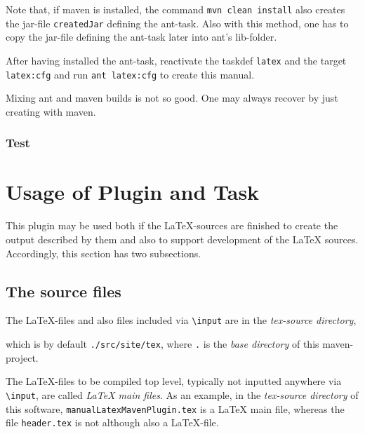 \documentclass[12pt]{book}
\renewcommand{\index}[1]{ }
\begin{document}
Note that, if maven is installed, the command \texttt{mvn clean install} 
also creates the jar-file \texttt{createdJar} defining the ant-task. 
Also with this method, one has to copy the jar-file defining the ant-task 
later into ant's lib-folder. 

After having installed the ant-task, 
reactivate the taskdef \texttt{latex} and the target \texttt{latex:cfg} 
and run \texttt{ant latex:cfg} to create this manual. 

Mixing ant and maven builds is not so good. 
One may always recover by just creating with maven. 

\subsection{Test}

\chapter{Usage of Plugin and Task}\label{chap:usage}

This plugin may be used both if the \LaTeX-sources are finished 
to create the output described by them 
and also to support development of the \LaTeX{} sources. 
Accordingly, this section has two subsections. 

\section{The source files}\label{sec:sources}

The \LaTeX-files and also files included via {\tt\textbackslash input} 
are in the {\em tex-source directory}, 
\index{tex-source directory}
which is by default {\tt./src/site/tex}, 
where {\tt.} is the {\em base directory\/} of this maven-project. 
\index{base directory}
The \LaTeX-files to be compiled top level, 
typically not inputted anywhere via {\tt\textbackslash input}, 
are called {\em \LaTeX{} main files}. 
As an example, 
in the {\em tex-source directory\/} of this software, 
\texttt{manualLatexMavenPlugin.tex} is a \LaTeX{} main file, 
whereas the file \texttt{header.tex} is not although also a \LaTeX-file. 
\index{latex main file}
\end{document}
